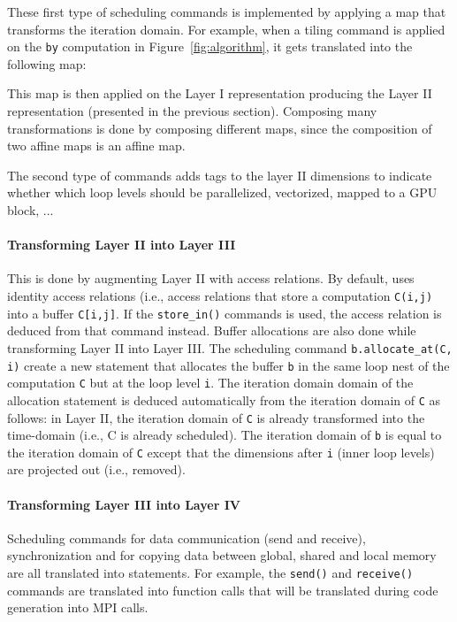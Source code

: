 These first type of scheduling commands is implemented by applying a map that transforms the iteration domain.  For example, when a tiling command is applied on the \texttt{by} computation in Figure~\ref{fig:algorithm}, it gets translated into the following map:

\centerline{}
\centerline{}

This map is then applied on the Layer I representation producing the Layer II representation (presented in the previous section). Composing many transformations is done by composing different maps, since the composition of two affine maps is an affine map.

The second type of commands adds \processor tags to the layer II dimensions to indicate whether which loop levels should be parallelized, vectorized, mapped to a GPU block, ...

\vspace{-0.25cm}
\paragraph{Transforming Layer II into Layer III}
This is done by augmenting Layer II with access relations.  By default, \framework{} uses identity access relations (i.e., access relations that store a computation \texttt{C(i,j)} into a buffer \texttt{C[i,j]}.  If the \texttt{store\_in()} commands is used, the access relation is deduced from that command instead.  Buffer allocations are also done while transforming Layer II into Layer III. The scheduling command \texttt{b.allocate\_at(C, i)} create a new statement that allocates the buffer \texttt{b} in the same loop nest of the computation \texttt{C} but at the loop level \texttt{i}.
The iteration domain domain of the allocation statement is deduced automatically from the iteration domain of \texttt{C} as follows: in Layer II, the iteration domain of \texttt{C} is already transformed into the time-\processor domain (i.e., C is already scheduled).  The iteration domain of \texttt{b} is equal to the iteration domain of \texttt{C} except that the dimensions after \texttt{i} (inner loop levels) are projected out (i.e., removed).

\vspace{-0.25cm}
\paragraph{Transforming Layer III into Layer IV}
Scheduling commands for data communication (send and receive), synchronization and for copying data between global, shared and local memory are all translated into statements.  For example, the \texttt{send()} and \texttt{receive()} commands are translated into function calls that will be translated during code generation into MPI calls.

